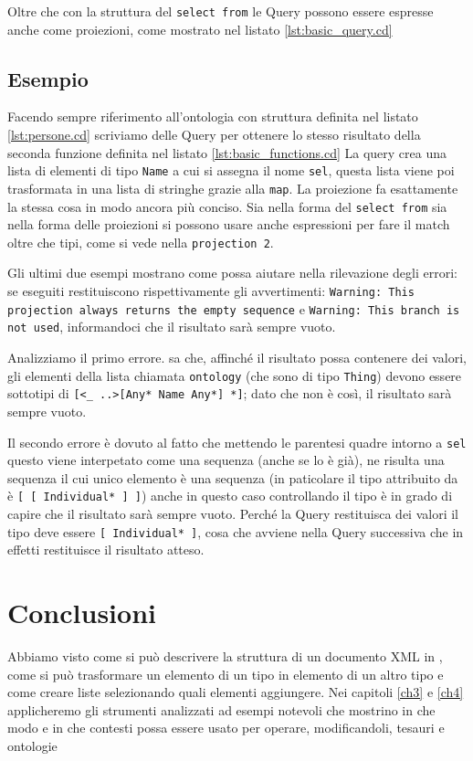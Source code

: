 Oltre che con la struttura del \verb|select from| le Query possono essere espresse anche come proiezioni, come mostrato nel listato \ref{lst:basic_query.cd}

\subsection{Esempio}
Facendo sempre riferimento all'ontologia con struttura definita nel listato \ref{lst:persone.cd} scriviamo delle Query per ottenere lo stesso risultato della seconda funzione definita nel listato \ref{lst:basic_functions.cd}
La query crea una lista di elementi di tipo \verb|Name| a cui si assegna il nome \verb|sel|, questa lista viene poi trasformata in una lista di stringhe grazie alla \verb|map|. La proiezione fa esattamente la stessa cosa in modo ancora più conciso. Sia nella forma del \verb|select from| sia nella forma delle proiezioni si possono usare anche espressioni per fare il match oltre che tipi, come si vede nella \verb|projection 2|.

Gli ultimi due esempi mostrano come \cduce possa aiutare nella rilevazione degli errori: se eseguiti restituiscono rispettivamente gli avvertimenti: \texttt{Warning: This projection always returns the empty sequence} e \texttt{Warning: This branch is not used}, informandoci che il risultato sarà sempre vuoto.

Analizziamo il primo errore. \cduce sa che, affinché il risultato possa contenere dei valori, gli elementi della lista chiamata \verb|ontology| (che sono di tipo \verb|Thing|) devono essere sottotipi di \verb|[<_ ..>[Any* Name Any*] *]|; dato che non è così, il risultato sarà sempre vuoto.

Il secondo errore è dovuto al fatto che mettendo le parentesi quadre intorno a \verb|sel| questo viene interpetato come una sequenza (anche se lo è già), ne risulta una sequenza il cui unico elemento è una sequenza (in paticolare il tipo attribuito da \cduce è \verb|[ [ Individual* ] ]|) anche in questo caso controllando il tipo \cduce è in grado di capire che il risultato sarà sempre vuoto. Perché la Query restituisca dei valori il tipo deve essere \verb|[ Individual* ]|, cosa che avviene nella Query successiva che in effetti restituisce il risultato atteso.

\section*{Conclusioni}
Abbiamo visto come si può descrivere la struttura di un documento XML in \cduce, come si può trasformare un elemento di un tipo in elemento di un altro tipo e come creare liste selezionando quali elementi aggiungere. Nei capitoli \ref{ch3} e \ref{ch4} applicheremo gli strumenti analizzati ad esempi notevoli che mostrino in che modo e in che contesti \cduce possa essere usato per operare, modificandoli, tesauri e ontologie